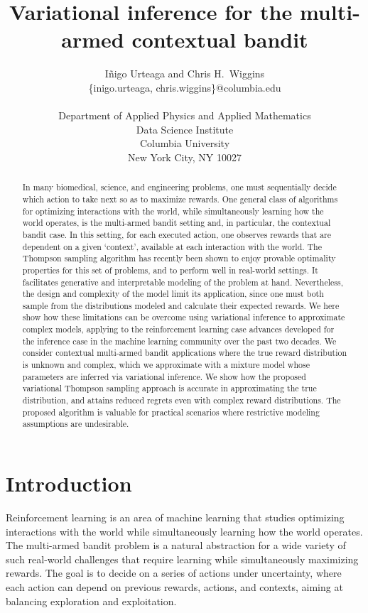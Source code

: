 \documentclass{article}
\title{Variational inference for the multi-armed contextual bandit}
\author{ I\~{n}igo Urteaga and Chris H.~Wiggins\\
	{\sf \{inigo.urteaga, chris.wiggins\}@columbia.edu} \\\\
	Department of	Applied Physics and Applied Mathematics\\
	Data Science Institute\\
	Columbia University\\
	New York City, NY 10027
}
\begin{document}
\maketitle

\begin{abstract}
In many biomedical, science, and engineering problems, one must sequentially decide which action to take next so as to maximize rewards. One general class of algorithms for optimizing interactions with the world, while simultaneously learning how the world operates, is the multi-armed bandit setting and, in particular, the contextual bandit case. In this setting, for each executed action, one observes rewards that are dependent on a given `context', available at each interaction with the world. The Thompson sampling algorithm has recently been shown to enjoy provable optimality properties for this set of problems, and to perform well in real-world settings. It facilitates  generative and interpretable modeling of the problem at hand. Nevertheless, the design and complexity of the model limit its application, since one must both sample from the distributions modeled and calculate their expected rewards. We here show how these limitations can be overcome using variational inference to approximate complex models, applying to the reinforcement learning case advances developed for the inference case in the machine learning community over the past two decades. We consider contextual multi-armed bandit applications where the true reward distribution is unknown and complex, which we approximate with a mixture model whose parameters are inferred via variational inference. We show how the proposed variational Thompson sampling approach is accurate in approximating the true distribution, and attains reduced regrets even with complex reward distributions. The proposed algorithm is valuable for practical scenarios where restrictive modeling assumptions are undesirable.
\end{abstract}

\section{Introduction}
\label{sec:introduction}

Reinforcement learning is an area of machine learning that studies optimizing interactions with the world while simultaneously learning how the world operates. The multi-armed bandit problem \cite{b-Sutton1998,j-Ghavamzadeh2015} is a natural abstraction for a wide variety of such real-world challenges that require learning while simultaneously maximizing rewards. The goal is to decide on a series of actions under uncertainty, where each action can depend on previous rewards, actions, and contexts, aiming at balancing exploration and exploitation.
\end{document}
